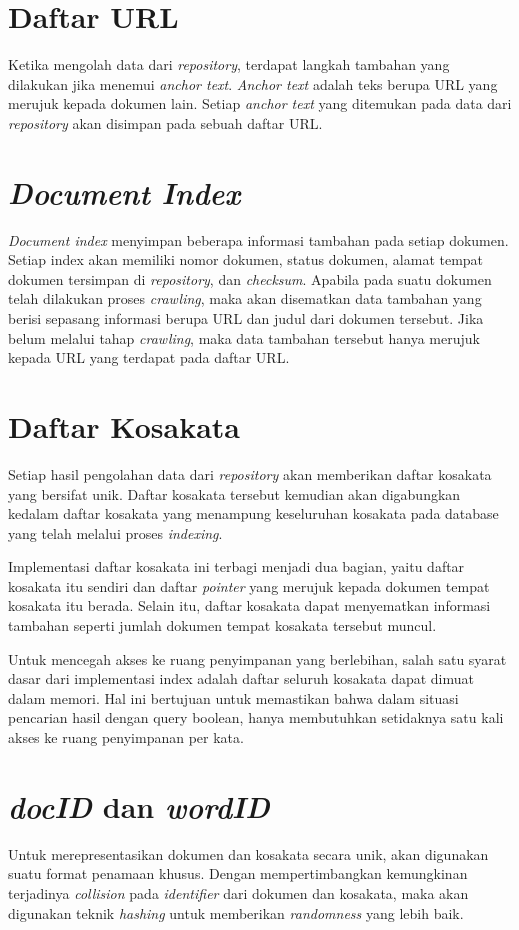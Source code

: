 \section{Daftar URL}

Ketika mengolah data dari \emph{repository}, terdapat langkah tambahan yang
dilakukan jika menemui \emph{anchor text}. \emph{Anchor text} adalah teks berupa
URL yang merujuk kepada dokumen lain. Setiap \emph{anchor text} yang ditemukan
pada data dari \emph{repository} akan disimpan pada sebuah daftar URL\@.

\section{\emph{Document Index}}
\emph{Document index} menyimpan beberapa informasi tambahan pada setiap dokumen.
Setiap index akan memiliki nomor dokumen, status dokumen, alamat tempat dokumen
tersimpan di \emph{repository}, dan \emph{checksum}. Apabila pada suatu dokumen
telah dilakukan proses \emph{crawling}, maka akan disematkan data tambahan yang
berisi sepasang informasi berupa URL dan judul dari dokumen tersebut. Jika
belum melalui tahap \emph{crawling}, maka data tambahan tersebut hanya merujuk
kepada URL yang terdapat pada daftar URL\@.

\section{Daftar Kosakata}

Setiap hasil pengolahan data dari \emph{repository} akan memberikan daftar
kosakata yang bersifat unik. Daftar kosakata tersebut kemudian akan digabungkan
kedalam daftar kosakata yang menampung keseluruhan kosakata pada database yang
telah melalui proses \emph{indexing}.

Implementasi daftar kosakata ini terbagi menjadi dua bagian, yaitu daftar
kosakata itu sendiri dan daftar \emph{pointer} yang merujuk kepada dokumen
tempat kosakata itu berada. Selain itu, daftar kosakata dapat menyematkan
informasi tambahan seperti jumlah dokumen tempat kosakata tersebut muncul.

Untuk mencegah akses ke ruang penyimpanan yang berlebihan, salah satu syarat
dasar dari implementasi index adalah daftar seluruh kosakata dapat dimuat dalam
memori. Hal ini bertujuan untuk memastikan bahwa dalam situasi pencarian hasil
dengan query boolean, hanya membutuhkan setidaknya satu kali akses ke ruang
penyimpanan per kata.

\section{\textit{docID} dan \textit{wordID}}
Untuk merepresentasikan dokumen dan kosakata secara unik, akan digunakan suatu
format penamaan khusus. Dengan mempertimbangkan kemungkinan terjadinya
\textit{collision} pada \textit{identifier} dari dokumen dan kosakata, maka 
akan digunakan teknik \textit{hashing} untuk memberikan \textit{randomness} yang
lebih baik.

